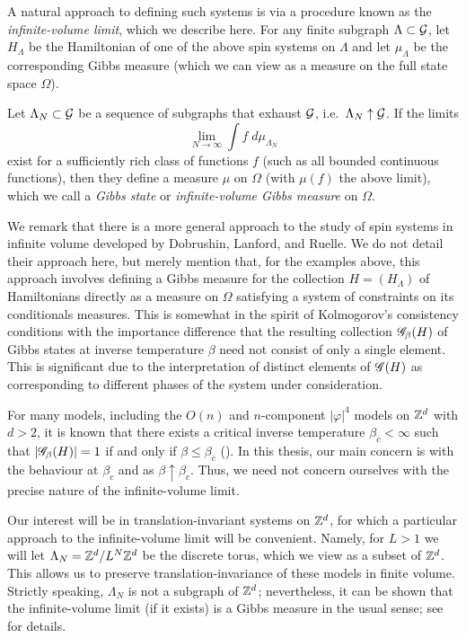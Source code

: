 A natural approach to defining such systems is via a procedure known as the
\emph{infinite-volume limit}, which we describe here. For any
finite subgraph $\Lambda \subset \mathcal{G}$, let $H_\Lambda$ be the Hamiltonian
of one of the above spin systems on $\Lambda$ and let $\mu_\Lambda$ be the
corresponding Gibbs measure (which we can view as a measure on the full state
space $\Omega$).

Let $\Lambda_N \subset \mathcal{G}$ be a sequence of subgraphs that exhaust
$\mathcal{G}$, i.e.\ $\Lambda_N \uparrow \mathcal{G}$. If the limits
\begin{equation}
\lim_{N\to\infty} \int f \; d\mu_{\Lambda_N}
\end{equation}
exist for a sufficiently rich class of functions $f$ (such as all bounded continuous functions), then they define a measure $\mu$ on $\Omega$ (with $\mu(f)$ the above limit), which we call a \emph{Gibbs state} or
\emph{infinite-volume Gibbs measure} on $\Omega$.

We remark that there is a more general approach to the study of spin systems in infinite volume developed by Dobrushin, Lanford, and Ruelle. We do not detail their approach here, but merely mention that, for the examples above, this approach involves defining a Gibbs measure for the collection
$H = (H_\Lambda)$ of Hamiltonians directly as a measure on $\Omega$ satisfying a system of constraints on its conditionals measures. This is somewhat in the spirit of Kolmogorov's consistency conditions with the importance difference that the resulting collection $\mathscr{G}_\beta(H)$ of Gibbs states at inverse temperature
$\beta$ need not consist of only a single element. This is significant due to the interpretation of distinct elements of $\mathscr{G}(H)$ as corresponding to different phases of the system under consideration.

For many models, including the $O(n)$ and $n$-component $|\varphi|^4$ models on ${ {{\mathbb Z}}^d }$ with $d > 2$, it is known that there exists a critical inverse temperature $\beta_c < \infty$ such that
$|\mathscr{G}_\beta(H)| = 1$ if and only if $\beta \le \beta_c$ (\REF). In this thesis, our main concern is with the behaviour at $\beta_c$ and as
$\beta \uparrow \beta_c$. Thus, we need not concern ourselves with the precise nature of the infinite-volume limit.

\begin{rk}
Our interest will be in translation-invariant systems on ${ {{\mathbb Z}}^d }$, for which a particular approach to the infinite-volume limit will be convenient. Namely, for $L > 1$ we will let $\Lambda_N = { {{\mathbb Z}}^d }/L^N{ {{\mathbb Z}}^d }$ be the discrete torus, which we view as a subset of ${ {{\mathbb Z}}^d }$. This allows us to preserve
translation-invariance of these models in finite volume. Strictly speaking, $\Lambda_N$ is not a subgraph of ${ {{\mathbb Z}}^d }$; nevertheless, it can be shown that the infinite-volume limit (if it exists) is a Gibbs measure in the usual sense; see \cite[Example 4.20]{Georgii11} for details.
\end{rk}


